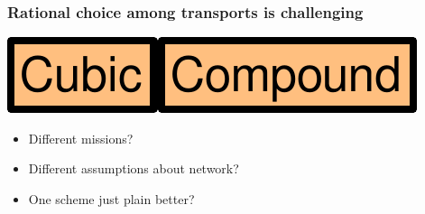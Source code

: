\documentclass[svgnames]{beamer}
\newcommand{\ssline}{\vspace{8 pt}}
\begin{document}
\begin{frame}
\frametitle{Rational choice among transports is challenging}

\begin{centering}
\includegraphics[height=20 pt]{cubic.pdf}\hspace{8 pt}{\bf vs.}\hspace{8 pt}\includegraphics[height=20 pt]{compound.pdf}

\end{centering}

\ssline
\ssline
\ssline

\begin{itemize}

\Large

\item Different missions?

\item Different assumptions about network?

\item One scheme just plain better?

\end{itemize}

\end{frame}
\end{document}
